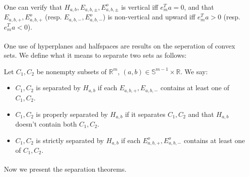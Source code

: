 \paragraph{}One can verify that $H_{a,b},E_{a,b,\pm},E^o_{a,b,\pm}$ is vertical iff $e_m^Ta=0$, and that $E_{a,b,+},E_{a,b,+}^o$ (resp. $E_{a,b,-},E^o_{a,b,-}$) is non-vertical and upward iff $e_m^Ta>0$ (resp. $e_m^Ta<0$).

\paragraph{}One use of hyperplanes and halfspaces are results on the seperation of convex sets. We define what it means to separate two sets as follows:
\begin{defn}[Separation]\label{defn:015-hyperplane-sep}
	Let $C_1,C_2$ be nonempty subsets of $\mathbb{R}^m$, $(a,b)\in \mathbb{S}^{m-1}\times \mathbb{R}$. We say:
	\begin{itemize}
		\item $C_1,C_2$ is separated by $H_{a,b}$ if each $E_{a,b,+},E_{a,b,-}$ contains at least one of $C_1,C_2$.
		\item $C_1,C_2$ is properly separated by $H_{a,b}$ if it separates $C_1,C_2$ and that $H_{a,b}$ doesn't contain both $C_1,C_2$.
		\item $C_1,C_2$ is strictly separated by $H_{a,b}$ if each $E^o_{a,b,+},E^o_{a,b,-}$ contains at least one of $C_1,C_2$.
	\end{itemize}
\end{defn}

\paragraph{}Now we present the separation theorems.

